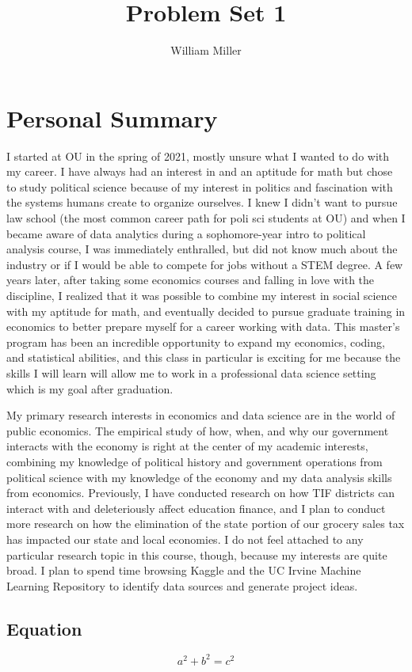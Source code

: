 \documentclass{article}
\title{Problem Set 1}
\author{William Miller}
\begin{document}
\maketitle

\section{Personal Summary}

I started at OU in the spring of 2021, mostly unsure what I wanted to do with my career. I have always had an interest in and an aptitude for math but chose to study political science because of my interest in politics and fascination with the systems humans create to organize ourselves. I knew I didn’t want to pursue law school (the most common career path for poli sci students at OU) and when I became aware of data analytics during a sophomore-year intro to political analysis course, I was immediately enthralled, but did not know much about the industry or if I would be able to compete for jobs without a STEM degree. A few years later, after taking some economics courses and falling in love with the discipline, I realized that it was possible to combine my interest in social science with my aptitude for math, and eventually decided to pursue graduate training in economics to better prepare myself for a career working with data. This master’s program has been an incredible opportunity to expand my economics, coding, and statistical abilities, and this class in particular is exciting for me because the skills I will learn will allow me to work in a professional data science setting which is my goal after graduation. 

My primary research interests in economics and data science are in the world of public economics. The empirical study of how, when, and why our government interacts with the economy is right at the center of my academic interests, combining my knowledge of political history and government operations from political science with my knowledge of the economy and my data analysis skills from economics. Previously, I have conducted research on how TIF districts can interact with and deleteriously affect education finance, and I plan to conduct more research on how the elimination of the state portion of our grocery sales tax has impacted our state and local economies. I do not feel attached to any particular research topic in this course, though, because my interests are quite broad. I plan to spend time browsing Kaggle and the UC Irvine Machine Learning Repository to identify data sources and generate project ideas. 

\subsection{Equation}

\begin{equation}
a^2 + b^2 = c^2
\end{equation}
\end{document}
